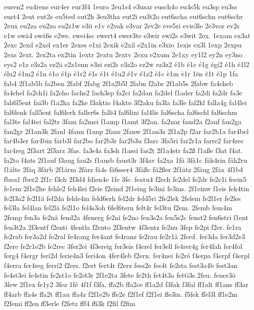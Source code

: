 {euren2
eu4rens
eur4er
eur3f4
1euro
2eu1s4
e3usar
eusch4o
eu4s5k
eu3sp
eu3ss
eust4
2eut
eut2e
eu5ted
eut2h
3eu3tha
eut2i
eu3t2o
eut6scha
eut6schn
eut6schr
2eux
eu2za
eu2zo
eu2z1w
e3ü
e1v
e2vak
e3var
2ev2e
eve5ri
evie3le
2e3vor
ev2s
e1w
ewä4
ewä6s
e2we.
ewei4sc
ewert4
ewer3te
e3wir
ewi2s
e3wit
2ex.
1exam
ex3at
2exc
2exd
e2xel
ex1er
2exes
e1xi
2exik
e2xil
e2x1in
e3xio
1exis
ex3l
1exp
2expu
2exs
2ext.
2ex2ta
ex2tin
1extr
2extu
2extv
2exu
e2xum
2e1xy
ey1l2
ey2n
ey3no
eys2
e1z
e3z2a
ez2ä
e2z1enn
e3zi
ezi2s
e3z2o
ez2w
ez3z2
é1b
é1c
é1g
égi2
é1h
é1l2
élu2
é1m2
é1n
é1o
é1p
é1r2
é1s
é1t
é1u2
é1v
é1z2
è1c
è1m
è1r
1ën
ë1t
ê1p
1fa
fab4
2f1ab5b
fa2ben
2fabf
2fabg
2f1a2b5l
2fabn
f2abr
2f1ab5s
2fabw
fa4cheb
fa4chel
fa2ch1i
fa2cho
fachs2
fach3sp
fa2ci
fa2dan
fa2del
f1ader
fa2di
fa2dr
fa3e
fah6l5ent
fai3b
f1a2ka
fa2ke
f3aktio
f4akto
3f2aku
fa3la
fa3le
fal2kl
falla4g
fal4lei
fal6lenk
fall5ent
fal6lerk
faller6s
falli4
fal6lini
fal4lis
fal6scha
fal6schl
fal6schm
fal3te
fal4tei
fal2tr
3fam
fa2mei
f1amp
f1amt
3f2an.
fa2nar
fand2a
f2anf
fan2ga
fan2gr
2f1an3k
2fanl
4fann
f1anp
2fanr
2fanw
2f1an3z
2f1a2p
f2ar
far2b1a
far4bel
far4b3er
far4bin
farb3l
far2bo
far2b3r
far2b3u
f3arc
3fa5ri
far2r1a
farre2
far4rec
far4reg
2f3art
2f3arz
3fas.
fa3s4a
fa3sh
f1assi
fas2t
2f1a4str
fa2ß
f1aße
f3at
f4at.
fa2to
f4ats
2f1auf
f3aug
fau2s
f1ausb
faust3r
3f4av
fa2xa
1fä
3fä1c
fäh4rin
fäh2ru
f1älte
2fäq
3färb
2f1ärm
2färz
fä4s
fä6sser4
3fäßc
fä2ßer
2f1ätz
2fäug
2fäx
4f1b4
fbau1
fber2
2f1c
f3ch
2f3d4
fdien4e
1fe
3fe.
featu4
f2ech
fe2del
fe2dr
fe2e1i
feein5
fe1em
2f1e2he
fehle2
feh4lei
f2eie
f2eind
2f1eing
fe3ini
fe3ins.
2f1einw
f1eis
fek4tin
fe2l3a2
fe2l1ä
fel2da
felde4m
feld6erh
fel2dr
feld5ri
2fe2lek
2felem
fe2l1er
fe2les
fel3la
fel4lan
fel2lä
fe2l1o
fel4s3oh
6fel6tern
felt4r
fel3tu
f2em.
2femb
fem4m
2femp
fen3a
fe2nä
fend2a
4fenerg
fe2ni
fe2no
fen3s2a
fen5s2c
fenst2
fen6stri
f1ent
fen3t2a
2f3entf
f2enti
4fentla
f2ento
2f3entw
4f3entz
fe2nu
3fep
fe2pi
f2er.
fe1ra
fe2rab
fer3a2d
fe2ral
fe4rang
fer4ant
fe4ranz
fe2rau
fe2r1ä
2ferd.
fer3da
fer3d2e3
f2ere
fe2r1e2b
fe2rec
3fer2ei
4f3ereig
fer3eis
f4erel
fer3ell
fe4rer4g
fer4fah
fer4fol
ferg4
f4ergr
feri2d
ferie4n3
feri4on
4fer4leb
f2ern.
fer4nei
fe2rö
f4erpa
f4erpf
f4erpl
f4erra
fer4reg
ferri2
f2ers.
f2ert
fert4r
f2erz
fess2e
fes4t
fe2sta
fest3a4b
fest3an
fe4st3ei
fe4stin
fe2st1o
fe2st3r
2f1e2ta
3fete
fe2th
fet4t3a
fetti3s
2feu.
feuer3ö
3few
2f1ex
fe1y2
3fez
1fé
4f1f
f3fa.
ffa2b
ffa2ce
ff1a2d
f3fak
f3fal
ff1alt
ff1ans
ff3ar
ff4arb
ffa4s
ffa2t
ff1au
ffa4z
f2f1e2b
ffe2e
f2f1ef
f2f1ei
ffe3in.
f5fek
ffel3l
ff1e2m
f2femi
ff2en
ff3erle
f2fetz
fff4
ffi3k
f2fil
f2fim
}
